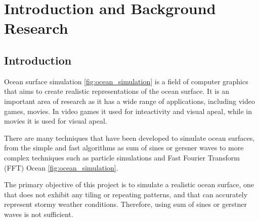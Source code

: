 \chapter{Introduction and Background Research}



\label{chapter1}

\section{Introduction}


Ocean surface simulation \ref{fig:ocean_simulation} is a field of computer graphics that aims to create realistic representations of the ocean surface.
It is an important area of research as it has a wide range of applications, including video games, movies.
In video games it used for inteactivity and visual apeal, while in movies it is used for visual apeal. 

There are many techniques that have been developed to simulate ocean surfaces, from the simple and fast algorithms as 
sum of sines or gersner waves to more complex techniques such as particle simulations and Fast Fourier Transform (FFT) Ocean \ref{fig:ocean_simulation}.

The primary objective of this project is to simulate a realistic ocean surface, 
one that does not exhibit any tiling or repeating patterns, and that can accurately 
represent stormy weather conditions. Therefore, using sum of sines or gerstner waves is not sufficient.

